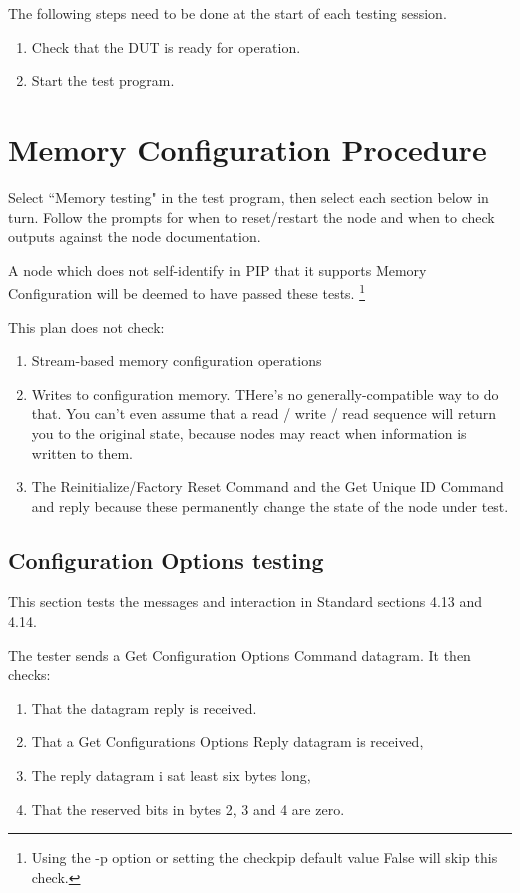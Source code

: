 \documentclass[11pt]{article}
\begin{document}
The following steps need to be done at the start of each testing session.
\begin{enumerate}
\item Check that the DUT is ready for operation.
\item Start the test program.
\end{enumerate}

\section{Memory Configuration Procedure}

Select ``Memory testing" in the test program, 
then select each section below in turn.  Follow the prompts
for when to reset/restart the node and when to check 
outputs against the node documentation.

A node which does not self-identify in PIP that it supports
Memory Configuration will be deemed to have passed these tests.
\footnote{Using the -p option or setting the checkpip default value False will skip this check.}

This plan does not check:
\begin{enumerate}
\item Stream-based memory configuration operations
\item Writes to configuration memory.  THere's no generally-compatible way to do that.
You can't even assume that a read / write / read sequence will return you to the original
state, because nodes may react when information is written to them.
\item The Reinitialize/Factory Reset Command and the Get Unique ID Command and reply
because these permanently change the state of the node under test.
\end{enumerate}

\subsection{Configuration Options testing}

This section tests the messages and interaction in Standard sections 4.13 and 4.14.

The tester sends a Get Configuration Options Command datagram.  It then checks:
\begin{enumerate}
\item That the datagram reply is received.
\item That a Get Configurations Options Reply datagram is received,
\item The reply datagram i sat least six bytes long,
\item That the reserved bits in bytes 2, 3 and 4 are zero.
\end{enumerate}
\end{document}
